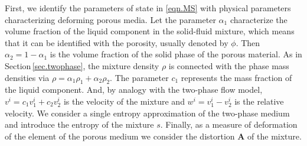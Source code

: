 \documentclass[3p,times,table]{article}
\renewcommand{\AA}{{\bm{A}}}
\begin{document}
First, we identify the parameters of state in \eqref{eqn.MS} with 
physical parameters characterizing 
deforming porous media.
Let the parameter $\alpha_1$ characterize the volume fraction of the liquid component 
in the solid-fluid mixture, which means that it can be identified with the 
porosity,
usually denoted by $ \phi $. Then $\alpha_2=1-\alpha_1$ is the volume fraction 
of the solid phase of the porous material. As in Section\,\ref{sec.twophase}, the mixture density  
$\rho$ is connected 
with the phase mass densities via $\rho=\alpha_1\rho_1+\alpha_2\rho_2$. 
The parameter 
$c_1$ represents the mass fraction of the liquid component. And, by analogy 
with the two-phase flow
model, $v^i=c_1v_1^i+c_2v_2^i$ is the velocity of the mixture and 
$w^i=v_1^i-v_2^i$ is the relative velocity.
We consider a single entropy approximation of the two-phase medium and introduce 
the entropy of the mixture $s$. Finally, as a measure of deformation of the 
element of the porous medium we consider the distortion $\AA$ of the mixture.  
\end{document}
